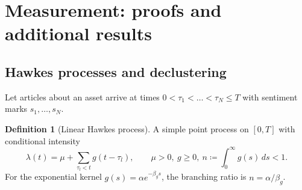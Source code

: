 \documentclass{article}
\theoremstyle{plain}
\theoremstyle{definition}
\newtheorem{definition}[theorem]{Definition}
\theoremstyle{remark}
\begin{document}
\section{Measurement: proofs and additional results}\label{app:measure}

\subsection{Hawkes processes and declustering}
Let articles about an asset arrive at times $0<\tau_1<\dots<\tau_N\le T$ with sentiment marks $s_1,\dots,s_N$.

\begin{definition}[Linear Hawkes process]
A simple point process on $[0,T]$ with conditional intensity
\[
  \lambda(t)=\mu+\sum_{\tau_l<t}g(t-\tau_l),\qquad \mu>0,\ g\ge0,\ n\coloneqq\int_0^\infty g(s)\,ds<1 .
\]
For the exponential kernel $g(s)=\alpha e^{-\beta_g s}$, the branching ratio is $n=\alpha/\beta_g$.
\end{definition}
\end{document}
